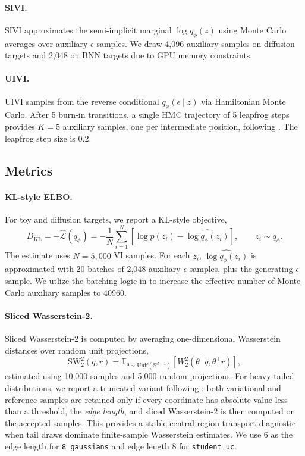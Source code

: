 \paragraph{SIVI.}
SIVI approximates the semi-implicit marginal $\log q_\phi(z)$ using Monte Carlo averages over auxiliary $\epsilon$ samples.  We draw 4,096 auxiliary samples on diffusion targets and 2,048 on BNN targets due to GPU memory constraints.

\paragraph{UIVI.}
UIVI samples from the reverse conditional $q_\phi(\epsilon \mid z)$ via Hamiltonian Monte Carlo.  After 5 burn-in transitions, a single HMC trajectory of 5 leapfrog steps provides $K=5$ auxiliary samples, one per intermediate position, following \citet{titsias2019unbiased}.  The leapfrog step size is 0.2.

\subsection{Metrics}
\label{app:metric-details}

\paragraph{KL-style ELBO.}
For toy and diffusion targets, we report a KL-style objective,
\begin{equation}
  D_{\mathrm{KL}}
  =
  -\widehat{\mathcal{L}}(q_\phi)
  =
  -\frac{1}{N}
  \sum_{i=1}^{N}
  \left[
    \log p(z_i) - \widehat{\log q_\phi(z_i)}
  \right],
  \qquad
  z_i \sim q_\phi .
\end{equation}
The estimate uses $N=5{,}000$ VI samples.  For each $z_i$, $\widehat{\log q_\phi(z_i)}$ is approximated with 20 batches of 2,048 auxiliary $\epsilon$ samples, plus the generating $\epsilon$ sample. We utlize the batching logic in \cite{pielok2025revisiting} to increase the effective number of Monte Carlo auxiliary samples to 40960.

\paragraph{Sliced Wasserstein-2.}
Sliced Wasserstein-2 is computed by averaging one-dimensional Wasserstein distances over random unit projections,
\begin{equation}
  \mathrm{SW}_2^2(q,r)
  =
  \mathbb{E}_{\theta \sim \mathrm{Unif}(\mathbb{S}^{d-1})}
  \left[
    W_2^2\!\left(\theta^\top q,\theta^\top r\right)
  \right],
\end{equation}
estimated using 10,000 samples and 5,000 random projections.  For heavy-tailed distributions, we report a truncated variant following \cite{li2023samplingmollifiedinteractionenergy}: both variational and reference samples are retained only if every coordinate has absolute value less than a threshold, the \textit{edge length}, and sliced Wasserstein-2 is then computed on the accepted samples.  This provides a stable central-region transport diagnostic when tail draws dominate finite-sample Wasserstein estimates.  We use 6 as the edge length for \texttt{8\_gaussians} and edge length 8 for \texttt{student\_uc}. 

